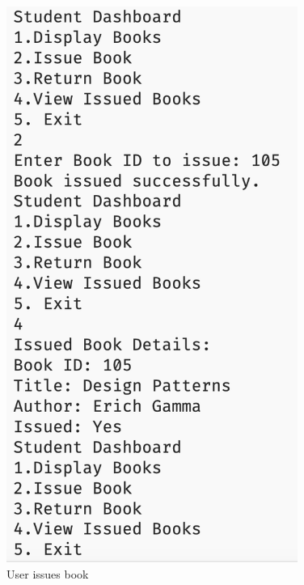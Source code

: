 \documentclass[12pt,a4paper]{report}
\begin{document}
\begin{figure}[h!]
    \centering
    \includegraphics[width=0.85\textwidth, height=0.65\textheight, keepaspectratio]{"./src/Screenshot_2024-11-24_at_16.15.27.png"}
    \caption{User issues book}
    \label{fig:third}
\end{figure}
\end{document}
